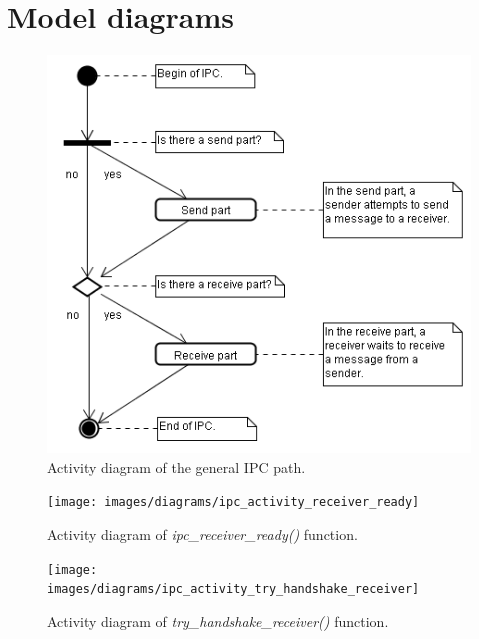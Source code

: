 \hypertarget{model_diagrams}{\chapter{Model diagrams}}

\begin{figure}[ht]
\includegraphics[scale=0.50]{images/diagrams/ipc_activity_ipc_overview}
\caption{Activity diagram of the general IPC path.}
\end{figure}

\begin{figure}[ht]
\texttt{[image: images/diagrams/ipc\_activity\_receiver\_ready]}
\caption{Activity diagram of \emph{ipc\_receiver\_ready()} function.}
\end{figure}

\begin{figure}[ht]
\texttt{[image: images/diagrams/ipc\_activity\_try\_handshake\_receiver]}
\caption{Activity diagram of \emph{try\_handshake\_receiver()} function.}
\end{figure}